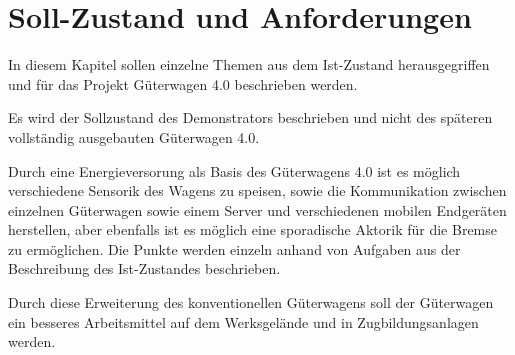 \section{Soll-Zustand und Anforderungen}
In diesem Kapitel sollen einzelne Themen aus dem Ist-Zustand herausgegriffen und für das Projekt Güterwagen 4.0 beschrieben werden.\par
Es wird der Sollzustand des Demonstrators beschrieben und nicht des späteren vollständig ausgebauten Güterwagen 4.0.\par
Durch eine Energieversorung als Basis des Güterwagens 4.0 ist es möglich verschiedene Sensorik des Wagens zu speisen, sowie die Kommunikation zwischen einzelnen Güterwagen sowie einem Server und verschiedenen mobilen Endgeräten herstellen, aber ebenfalls ist es möglich eine sporadische Aktorik für die Bremse zu ermöglichen. Die Punkte werden einzeln anhand von Aufgaben aus der Beschreibung des Ist-Zustandes beschrieben. \par
Durch diese Erweiterung des konventionellen Güterwagens soll der Güterwagen ein besseres Arbeitsmittel auf dem Werksgelände und in Zugbildungsanlagen werden.


